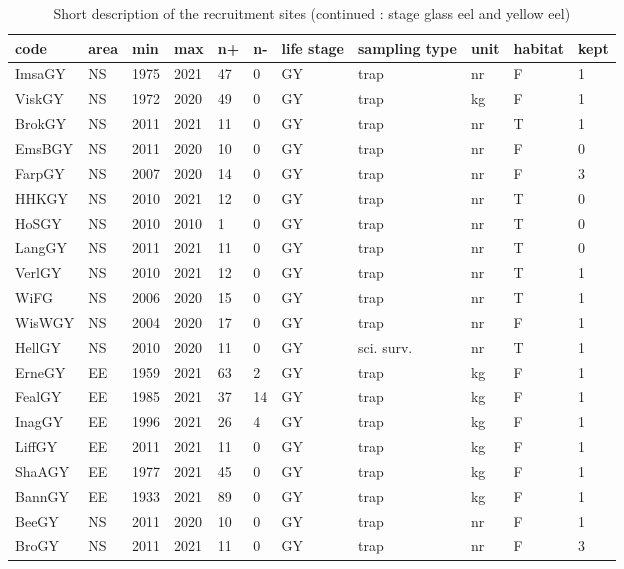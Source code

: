\begin{table}[htbp]
\centering
\caption{Short description of the recruitment sites (continued : stage glass eel and yellow eel)} 
\label{statseriesGY}
\begin{tabular}{p{1cm}p{1cm}p{1cm}p{1cm}p{0.8cm}p{0.8cm}p{1cm}p{2cm}p{2cm}p{1cm}p{1cm}}
  \hline
code & area & min & max & n+ & n- & life stage & sampling type & unit & habitat & kept \\ 
  \hline
ImsaGY & NS & 1975 & 2021 & 47 & 0 & GY & trap & nr & F & 1 \\ 
  ViskGY & NS & 1972 & 2020 & 49 & 0 & GY & trap & kg & F & 1 \\ 
  BrokGY & NS & 2011 & 2021 & 11 & 0 & GY & trap & nr & T & 1 \\ 
  EmsBGY & NS & 2011 & 2020 & 10 & 0 & GY & trap & nr & F & 0 \\ 
  FarpGY & NS & 2007 & 2020 & 14 & 0 & GY & trap & nr & F & 3 \\ 
  HHKGY & NS & 2010 & 2021 & 12 & 0 & GY & trap & nr & T & 0 \\ 
  HoSGY & NS & 2010 & 2010 & 1 & 0 & GY & trap & nr & T & 0 \\ 
  LangGY & NS & 2011 & 2021 & 11 & 0 & GY & trap & nr & T & 0 \\ 
  VerlGY & NS & 2010 & 2021 & 12 & 0 & GY & trap & nr & T & 1 \\ 
  WiFG & NS & 2006 & 2020 & 15 & 0 & GY & trap & nr & T & 1 \\ 
  WisWGY & NS & 2004 & 2020 & 17 & 0 & GY & trap & nr & F & 1 \\ 
  HellGY & NS & 2010 & 2020 & 11 & 0 & GY & sci. surv. & nr & T & 1 \\ 
  ErneGY & EE & 1959 & 2021 & 63 & 2 & GY & trap & kg & F & 1 \\ 
  FealGY & EE & 1985 & 2021 & 37 & 14 & GY & trap & kg & F & 1 \\ 
  InagGY & EE & 1996 & 2021 & 26 & 4 & GY & trap & kg & F & 1 \\ 
  LiffGY & EE & 2011 & 2021 & 11 & 0 & GY & trap & kg & F & 1 \\ 
  ShaAGY & EE & 1977 & 2021 & 45 & 0 & GY & trap & kg & F & 1 \\ 
  BannGY & EE & 1933 & 2021 & 89 & 0 & GY & trap & kg & F & 1 \\ 
  BeeGY & NS & 2011 & 2020 & 10 & 0 & GY & trap & nr & F & 1 \\ 
  BroGY & NS & 2011 & 2021 & 11 & 0 & GY & trap & nr & F & 3 \\ 

\end{tabular}
\end{table}
